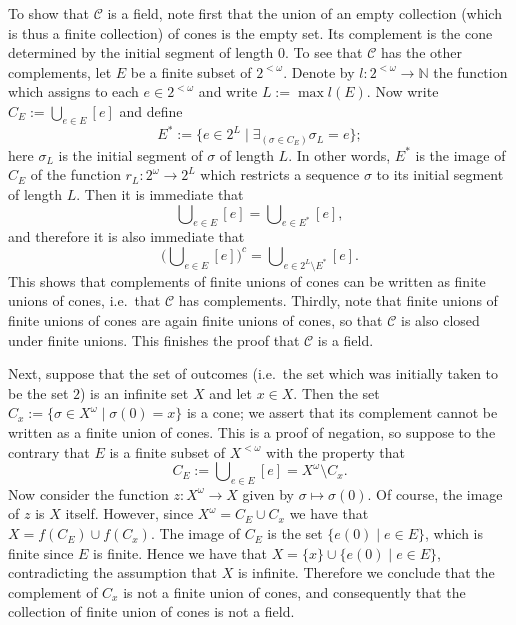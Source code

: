 \documentclass{article}
\begin{document}
\begin{ex}
To show that $\mathcal{C}$ is a field, note first that the union of an empty collection (which is thus a finite collection) of cones is the empty set. Its complement is the cone determined by the initial segment of length $0$. To see that $\mathcal{C}$ has the other complements, let $E$ be a finite subset of $2^{<\omega}$. Denote by $l:2^{<\omega}\to\mathbb{N}$ the function which assigns to each $e\in 2^{<\omega}$ and write $L:=\max l(E)$. Now write $C_E:=\bigcup_{e\in E}[e]$ and define
\begin{equation*}
E^\ast:=\{e\in 2^L\mid \exists_{(\sigma\in C_E)}\sigma_L= e\};
\end{equation*}
here $\sigma_L$ is the initial segment of $\sigma$ of length $L$. In other words, $E^\ast$ is the image of $C_E$ of the function $r_L:2^\omega\to 2^L$ which restricts a sequence $\sigma$ to its initial segment of length $L$. Then it is immediate that
\begin{equation*}
\bigcup\nolimits_{e\in E}[e]=\bigcup\nolimits_{e\in E^\ast}[e],
\end{equation*}
and therefore it is also immediate that
\begin{equation*}
\Big(\bigcup\nolimits_{e\in E}[e]\Big)^c = \bigcup\nolimits_{e\in 2^L\setminus E^\ast}[e].
\end{equation*}
This shows that complements of finite unions of cones can be written as finite unions of cones, i.e.~that $\mathcal{C}$ has complements. Thirdly, note that finite unions of finite unions of cones are again finite unions of cones, so that $\mathcal{C}$ is also closed under finite unions. This finishes the proof that $\mathcal{C}$ is a field.

Next, suppose that the set of outcomes (i.e.~the set which was initially taken to be the set $2$) is an infinite set $X$ and let $x\in X$. Then the set $C_x:=\{\sigma\in X^\omega\mid\sigma(0)=x\}$ is a cone; we assert that its complement cannot be written as a finite union of cones. This is a proof of negation, so suppose to the contrary that $E$ is a finite subset of $X^{<\omega}$ with the property that
\begin{equation*}
C_E:=\bigcup\nolimits_{e\in E}[e]=X^\omega\setminus C_x.
\end{equation*}
Now consider the function $z:X^\omega\to X$ given by $\sigma\mapsto\sigma(0)$. Of course, the image of $z$ is $X$ itself. However, since $X^\omega=C_E\cup C_x$ we have that $X=f(C_E)\cup f(C_x)$. The image of $C_E$ is the set $\{e(0)\mid e\in E\}$, which is finite since $E$ is finite. Hence we have that $X=\{x\}\cup\{e(0)\mid e\in E\}$, contradicting the assumption that $X$ is infinite. Therefore we conclude that the complement of $C_x$ is not a finite union of cones, and consequently that the collection of finite union of cones is not a field.


\end{ex}
\end{document}
